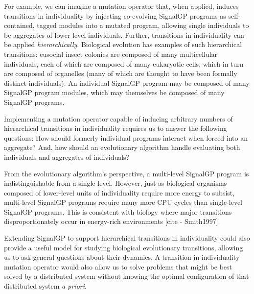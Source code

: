 
For example, we can imagine a mutation operator that, when applied, induces transitions in individuality by injecting co-evolving SignalGP programs as self-contained, tagged modules into a mutated program, allowing single individuals to be aggregates of lower-level individuals. 
Further, transitions in individuality can be applied \textit{hierarchically}. 
Biological evolution has examples of such hierarchical transitions: eusocial insect colonies are composed of many multicellular individuals, each of which are composed of many eukaryotic cells, which in turn are composed of organelles (many of which are thought to have been formally distinct individuals).
An individual SignalGP program may be composed of many SignalGP program modules, which may themselves be composed of many SignalGP programs. 

Implementing a mutation operator capable of inducing arbitrary numbers of hierarchical transitions in individuality requires us to answer the following questions: 
How should formerly individual programs interact when forced into an aggregate? 
And, how should an evolutionary algorithm handle evaluating both individuals and aggregates of individuals? 

From the evolutionary algorithm's perspective, a multi-level SignalGP program is indistinguishable from a single-level. 
However, just as biological organisms composed of lower-level units of individuality require more energy to subsist, multi-level SignalGP programs require many more CPU cycles than single-level SignalGP programs. 
This is consistent with biology where major transitions disproportionately occur in energy-rich environments [cite - Smith1997]. 

Extending SignalGP to support hierarchical transitions in individuality could also provide a useful model for studying biological evolutionary transitions, allowing us to ask general questions about their dynamics. 
A transition in individuality mutation operator would also allow us to solve problems that might be best solved by a distributed system without knowing the optimal configuration of that distributed system \textit{a priori}. 

